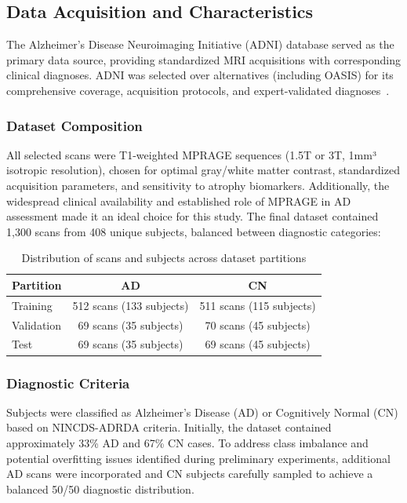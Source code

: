 \documentclass[12pt, a4paper]{article}
\begin{document}
\subsection{Data Acquisition and Characteristics}

The Alzheimer's Disease Neuroimaging Initiative (ADNI) database served as the primary data source, providing standardized MRI acquisitions with corresponding clinical diagnoses. ADNI was selected over alternatives (including OASIS) for its comprehensive coverage, acquisition protocols, and expert-validated diagnoses~\cite{jack2008alzheimer, lamontagne2019oasis}.

\subsubsection{Dataset Composition}

All selected scans were T1-weighted MPRAGE sequences (1.5T or 3T, 1mm³ isotropic resolution), chosen for optimal gray/white matter contrast, standardized acquisition parameters, and sensitivity to atrophy biomarkers. Additionally, the widespread clinical availability and established role of MPRAGE in AD assessment made it an ideal choice for this study. The final dataset contained 1,300 scans from 408 unique subjects, balanced between diagnostic categories:

\begin{table}[htbp]
\centering
\begin{tabular}{|l|c|c|}
\hline
\textbf{Partition} & \textbf{AD} & \textbf{CN} \\
\hline
Training & 512 scans (133 subjects) & 511 scans (115 subjects) \\
Validation & 69 scans (35 subjects) & 70 scans (45 subjects) \\
Test & 69 scans (35 subjects) & 69 scans (45 subjects) \\
\hline
\end{tabular}
\caption{Distribution of scans and subjects across dataset partitions}
\end{table}

\subsubsection{Diagnostic Criteria}

Subjects were classified as Alzheimer's Disease (AD) or Cognitively Normal (CN) based on NINCDS-ADRDA criteria. Initially, the dataset contained approximately 33\% AD and 67\% CN cases. To address class imbalance and potential overfitting issues identified during preliminary experiments, additional AD scans were incorporated and CN subjects carefully sampled to achieve a balanced 50/50 diagnostic distribution.
\end{document}

